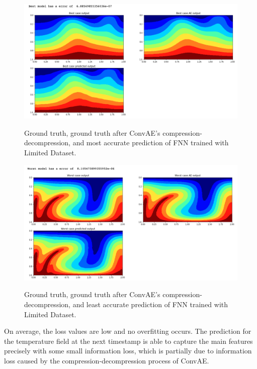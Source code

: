 \begin{figure}[H]
    \caption{Ground truth, ground truth after ConvAE's compression-decompression, and most accurate prediction of FNN trained with Limited Dataset.}
    \includegraphics[scale=0.5]{figures/mantle_convection_images/limited_dataset/FNN_Best.png}
    \label{figure:FNN_limited_best}
\end{figure}

\begin{figure}[H]
    \caption{Ground truth, ground truth after ConvAE's compression-decompression, and least accurate prediction of FNN trained with Limited Dataset.}
    \includegraphics[scale=0.5]{figures/mantle_convection_images/limited_dataset/FNN_Worst.png}
    \label{figure:FNN_limited_worst}
\end{figure}

On average, the loss values are low and no overfitting occurs. The prediction for the temperature field at the next timestamp is able to capture the main features precisely with some small information loss, which is partially due to information loss caused by the compression-decompression process of ConvAE.

